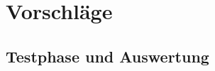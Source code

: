 \section{Vorschläge}
\label{sec:Vorschläge}
\vfill

\subsection{Testphase und Auswertung}
\label{subsec:TestenVonCRS}
\vfill
